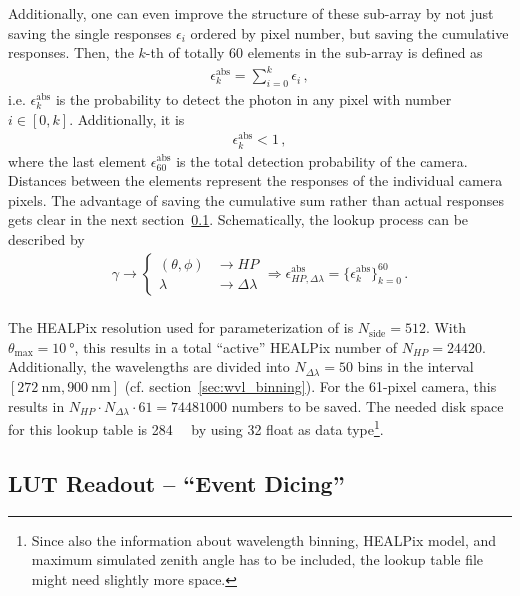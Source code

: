 Additionally, one can even improve the structure of these sub-array by not just saving the single responses $\epsilon_i$ ordered by pixel number, but saving the cumulative responses. Then, the $k$-th of totally \num{60} elements in the sub-array is defined as 
\begin{align}
	\epsilon^\text{abs}_k = \sum_{i=0}^{k} \epsilon_i\,,
	\label{eq:eps_cumulative}
\end{align}
i.e. $\epsilon^\text{abs}_k$ is the probability to detect the photon in any pixel with number $i\in[0,k]$. Additionally, it is
\begin{align}
\epsilon_k^\text{abs} < 1\,,
\end{align}
where the last element $\epsilon_{60}^\text{abs}$ is the total detection probability of the camera. Distances between the elements represent the responses of the individual camera pixels. The advantage of saving the cumulative sum rather than actual responses gets clear in the next section~\ref{sec:lut_readout}. Schematically, the lookup process can be described by
\begin{align}
	\gamma \rightarrow
	\begin{cases}
		(\theta,\phi) & \rightarrow HP\\
		\lambda & \rightarrow \Delta\lambda
	\end{cases}
	\Rightarrow \epsilon^\text{abs}_{HP,\Delta\lambda} = \{\epsilon^\text{abs}_k\}_{k=0}^{60}\,.
\end{align}\\

The HEALPix resolution used for parameterization of \iceact is $N_\text{side}=\num{512}$. With $\theta_\text{max}=\SI{10}{\degree}$, this results in a total \enquote{active} HEALPix number of $N_{HP}=\num{24420}$. Additionally, the wavelengths are divided into $N_{\Delta\lambda} = \num{50}$ bins in the interval $[\SI{272}{\nano\meter},\SI{900}{\nano\meter}]$ (cf. section~\ref{sec:wvl_binning}). For the \num{61}-pixel camera, this results in $N_{HP}\cdot N_{\Delta\lambda}\cdot \num{61} = \num{74481000}$ numbers to be saved. The needed disk space for this lookup table is \SI{284}{\mebi\byte} by using \SI{32}{\bit} float as data type\footnote{Since also the information about wavelength binning, HEALPix model, and maximum simulated zenith angle has to be included, the lookup table file might need slightly more space.}.

\subsection{LUT Readout -- \enquote{Event Dicing}}\label{sec:lut_readout}

